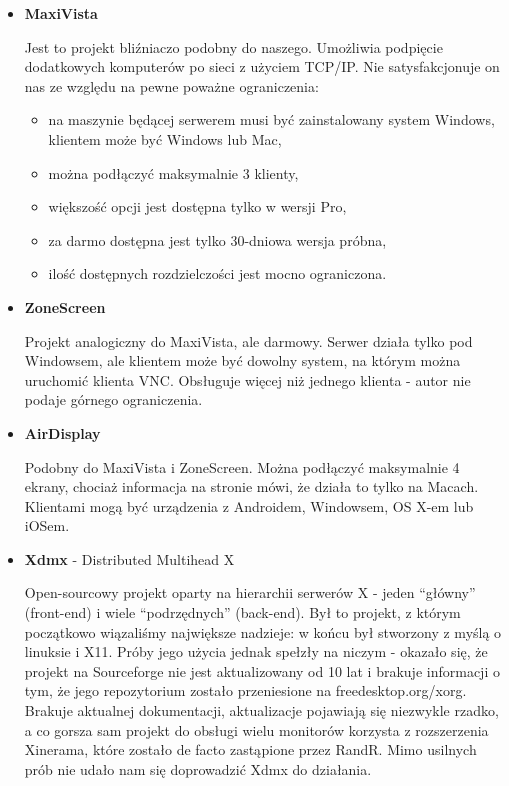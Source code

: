     \begin{itemize}

      \item \textbf{MaxiVista} \cite{ProjMaxiVista}

        Jest to projekt bliźniaczo podobny do naszego. Umożliwia podpięcie dodatkowych komputerów po sieci z użyciem TCP/IP. Nie satysfakcjonuje on nas ze względu na pewne poważne ograniczenia:
        \begin{itemize}
          \item na maszynie będącej serwerem musi być zainstalowany system Windows, klientem może być Windows lub Mac,
          \item można podłączyć maksymalnie 3 klienty,
          \item większość opcji jest dostępna tylko w wersji Pro,
          \item za darmo dostępna jest tylko 30-dniowa wersja próbna,
          \item ilość dostępnych rozdzielczości jest mocno ograniczona.
        \end{itemize}

      \item \textbf{ZoneScreen} \cite{ProjZoneScreen}

        Projekt analogiczny do MaxiVista, ale darmowy. Serwer działa tylko pod Windowsem, ale klientem może być dowolny system, na którym można uruchomić klienta VNC. Obsługuje więcej niż jednego klienta - autor nie podaje górnego ograniczenia.

      \item \textbf{AirDisplay} \cite{ProjAirDisplay}

        Podobny do MaxiVista i ZoneScreen. Można podłączyć maksymalnie 4 ekrany, chociaż informacja na stronie mówi, że działa to tylko na Macach. Klientami mogą być urządzenia z Androidem, Windowsem, OS X-em lub iOSem.

      \item \textbf{Xdmx} - Distributed Multihead X \cite{ProjXDMX}

        Open-sourcowy projekt oparty na hierarchii serwerów X - jeden ``główny'' (front-end) i wiele ``podrzędnych'' (back-end). Był to projekt, z którym początkowo wiązaliśmy największe nadzieje: w końcu był stworzony z myślą o linuksie i X11. Próby jego użycia jednak spełzły na niczym - okazało się, że projekt na Sourceforge nie jest aktualizowany od 10 lat i brakuje informacji o tym, że jego repozytorium zostało przeniesione na freedesktop.org/xorg. Brakuje aktualnej dokumentacji, aktualizacje pojawiają się niezwykle rzadko, a co gorsza sam projekt do obsługi wielu monitorów korzysta z rozszerzenia Xinerama, które zostało de facto zastąpione przez RandR. Mimo usilnych prób nie udało nam się doprowadzić Xdmx do działania.


\end{itemize}

